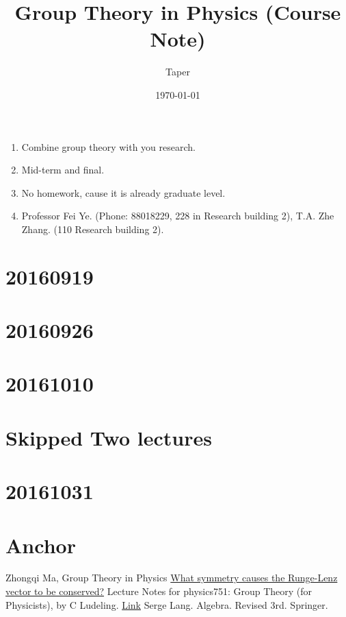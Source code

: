 \documentclass{article}
\title{Group Theory in Physics (Course Note)}
\date{\today}
\author{Taper}
\begin{document}
\maketitle
{}
\tableofcontents
\begin{enumerate}
    \item Combine group theory with you research.
    \item Mid-term and final.
    \item No homework, cause it is already graduate level.
    \item Professor Fei Ye. (Phone: 88018229, 228 in Research building 2), 
        T.A. Zhe Zhang. (110 Research building 2).
\end{enumerate}

\section{20160919}
\label{sec:20160919}


\section{20160926}
\label{sec:20160926}


\section{20161010}
\label{sec:20161010}


\section{Skipped Two lectures}


\section{20161031}
\label{sec:20161031}

\section{Anchor}
\label{sec:Anchor}
\begin{thebibliography}{1}
     Zhongqi Ma, Group Theory in Physics
     \href{physics.stackexchange.com/questions/18088/what-symmetry-causes-the-runge-lenz-vector-to-be-conserved}{What symmetry causes the Runge-Lenz vector to be conserved?}
     Lecture Notes for physics751: Group Theory (for
    Physicists), by C Ludeling.
    \href{http://www.th.physik.uni-bonn.de/nilles/people/luedeling/grouptheory/data/grouptheorynotes.pdf}{Link}
     Serge Lang. Algebra. Revised 3rd. Springer.
\end{thebibliography}
\printnomenclature
\end{document}
